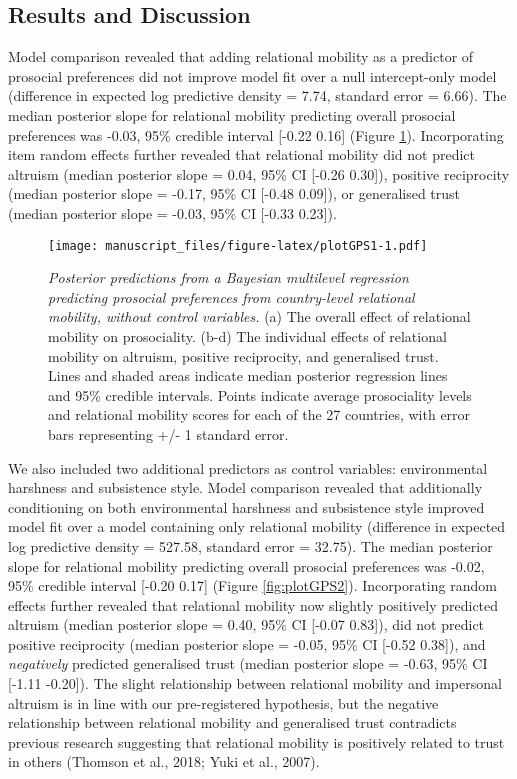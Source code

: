 \documentclass[
  man,floatsintext]{apa6}
\begin{document}
\hypertarget{results-and-discussion}{%
\subsection{Results and Discussion}\label{results-and-discussion}}

Model comparison revealed that adding relational mobility as a predictor of prosocial preferences did not improve model fit over a null intercept-only model (difference in expected log predictive density = 7.74, standard error = 6.66). The median posterior slope for relational mobility predicting overall prosocial preferences was -0.03, 95\% credible interval {[}-0.22 0.16{]} (Figure \ref{fig:plotGPS1}). Incorporating item random effects further revealed that relational mobility did not predict altruism (median posterior slope = 0.04, 95\% CI {[}-0.26 0.30{]}), positive reciprocity (median posterior slope = -0.17, 95\% CI {[}-0.48 0.09{]}), or generalised trust (median posterior slope = -0.03, 95\% CI {[}-0.33 0.23{]}).



\begin{figure}
\centering
\texttt{[image: manuscript\_files/figure-latex/plotGPS1-1.pdf]}
\caption{\label{fig:plotGPS1}\emph{Posterior predictions from a Bayesian multilevel regression predicting prosocial preferences from country-level relational mobility, without control variables.} (a) The overall effect of relational mobility on prosociality. (b-d) The individual effects of relational mobility on altruism, positive reciprocity, and generalised trust. Lines and shaded areas indicate median posterior regression lines and 95\% credible intervals. Points indicate average prosociality levels and relational mobility scores for each of the 27 countries, with error bars representing +/- 1 standard error.}
\end{figure}

We also included two additional predictors as control variables: environmental harshness and subsistence style. Model comparison revealed that additionally conditioning on both environmental harshness and subsistence style improved model fit over a model containing only relational mobility (difference in expected log predictive density = 527.58, standard error = 32.75). The median posterior slope for relational mobility predicting overall prosocial preferences was -0.02, 95\% credible interval {[}-0.20 0.17{]} (Figure \ref{fig:plotGPS2}). Incorporating random effects further revealed that relational mobility now slightly positively predicted altruism (median posterior slope = 0.40, 95\% CI {[}-0.07 0.83{]}), did not predict positive reciprocity (median posterior slope = -0.05, 95\% CI {[}-0.52 0.38{]}), and \emph{negatively} predicted generalised trust (median posterior slope = -0.63, 95\% CI {[}-1.11 -0.20{]}). The slight relationship between relational mobility and impersonal altruism is in line with our pre-registered hypothesis, but the negative relationship between relational mobility and generalised trust contradicts previous research suggesting that relational mobility is positively related to trust in others (Thomson et al., 2018; Yuki et al., 2007).
\end{document}
